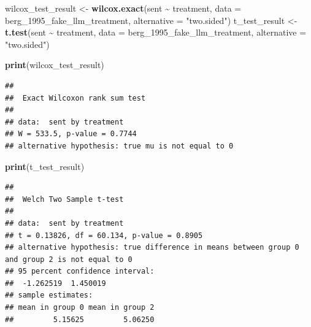 \documentclass[
]{article}
\newenvironment{Shaded}{\begin{snugshade}}{\end{snugshade}}
\newcommand{\AttributeTok}[1]{\textcolor[rgb]{0.13,0.29,0.53}{#1}}
\newcommand{\FunctionTok}[1]{\textcolor[rgb]{0.13,0.29,0.53}{\textbf{#1}}}
\newcommand{\NormalTok}[1]{#1}
\newcommand{\OtherTok}[1]{\textcolor[rgb]{0.56,0.35,0.01}{#1}}
\newcommand{\SpecialCharTok}[1]{\textcolor[rgb]{0.81,0.36,0.00}{\textbf{#1}}}
\newcommand{\StringTok}[1]{\textcolor[rgb]{0.31,0.60,0.02}{#1}}
\begin{document}
\begin{Shaded}
\begin{Highlighting}[]
\NormalTok{wilcox\_test\_result }\OtherTok{\textless{}{-}} \FunctionTok{wilcox.exact}\NormalTok{(sent }\SpecialCharTok{\textasciitilde{}}\NormalTok{ treatment, }\AttributeTok{data =}\NormalTok{ berg\_1995\_fake\_llm\_treatment, }\AttributeTok{alternative =} \StringTok{"two.sided"}\NormalTok{)}
\NormalTok{t\_test\_result }\OtherTok{\textless{}{-}} \FunctionTok{t.test}\NormalTok{(sent }\SpecialCharTok{\textasciitilde{}}\NormalTok{ treatment, }\AttributeTok{data =}\NormalTok{ berg\_1995\_fake\_llm\_treatment, }\AttributeTok{alternative =} \StringTok{"two.sided"}\NormalTok{)}

\FunctionTok{print}\NormalTok{(wilcox\_test\_result)}
\end{Highlighting}
\end{Shaded}

\begin{verbatim}
## 
##  Exact Wilcoxon rank sum test
## 
## data:  sent by treatment
## W = 533.5, p-value = 0.7744
## alternative hypothesis: true mu is not equal to 0
\end{verbatim}

\begin{Shaded}
\begin{Highlighting}[]
\FunctionTok{print}\NormalTok{(t\_test\_result)}
\end{Highlighting}
\end{Shaded}

\begin{verbatim}
## 
##  Welch Two Sample t-test
## 
## data:  sent by treatment
## t = 0.13826, df = 60.134, p-value = 0.8905
## alternative hypothesis: true difference in means between group 0 and group 2 is not equal to 0
## 95 percent confidence interval:
##  -1.262519  1.450019
## sample estimates:
## mean in group 0 mean in group 2 
##         5.15625         5.06250
\end{verbatim}
\end{document}
